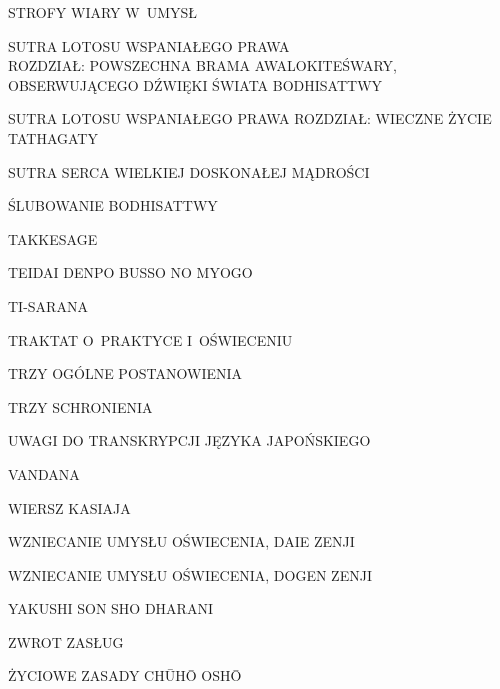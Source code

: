 \par\noindent STROFY WIARY W~UMYSŁ \dotfill \makebox[1.0cm][r]{\pageref{strofy_wiary_w_umysl}}
\par\noindent SUTRA LOTOSU WSPANIAŁEGO PRAWA\\ROZDZIAŁ: POWSZECHNA BRAMA AWALOKITEŚWARY, OBSERWUJĄCEGO DŹWIĘKI ŚWIATA BODHISATTWY \dotfill \makebox[1.0cm][r]{\pageref{sutralotosu_powszechna_brama}}
\par\noindent SUTRA LOTOSU WSPANIAŁEGO PRAWA ROZDZIAŁ: WIECZNE ŻYCIE TATHAGATY \dotfill \makebox[1.0cm][r]{\pageref{sutralotosu_wieczne_zycie}}
\par\noindent SUTRA SERCA WIELKIEJ DOSKONAŁEJ MĄDROŚCI \dotfill \makebox[1.0cm][r]{\pageref{serce_doskonalej_madrosci}}
\par\noindent ŚLUBOWANIE BODHISATTWY \dotfill \makebox[1.0cm][r]{\pageref{slubowanie_bodhisattwy}}
\par\noindent TAKKESAGE \dotfill \makebox[1.0cm][r]{\pageref{tekkesage}}
\par\noindent TEIDAI DENPO BUSSO NO MYOGO \dotfill \makebox[1.0cm][r]{\pageref{teidai_denpo_busso_no_myogo}}
\par\noindent TI-SARANA \dotfill \makebox[1.0cm][r]{\pageref{ti-sarana}}
\par\noindent TRAKTAT O~PRAKTYCE I~OŚWIECENIU \dotfill \makebox[1.0cm][r]{\pageref{traktat_o_praktyce}}
\par\noindent TRZY OGÓLNE POSTANOWIENIA \dotfill \makebox[1.0cm][r]{\pageref{trzy_ogolne_postanowienia}}
\par\noindent TRZY SCHRONIENIA \dotfill \makebox[1.0cm][r]{\pageref{trzy_schronienia}}
\par\noindent UWAGI DO TRANSKRYPCJI JĘZYKA JAPOŃSKIEGO \dotfill \makebox[1.0cm][r]{\pageref{uwagi_do_transkrypcji}}
\par\noindent VANDANA \dotfill \makebox[1.0cm][r]{\pageref{vandana}}
\par\noindent WIERSZ KASIAJA \dotfill \makebox[1.0cm][r]{\pageref{wiersz_kesy}}
\par\noindent WZNIECANIE UMYSŁU OŚWIECENIA, DAIE ZENJI \dotfill \makebox[1.0cm][r]{\pageref{wzniecanie_umyslu_oswiecenia_daie}}
\par\noindent WZNIECANIE UMYSŁU OŚWIECENIA, DOGEN ZENJI \dotfill \makebox[1.0cm][r]{\pageref{wzniecanie_umyslu_oswiecenia_dogen}}
\par\noindent YAKUSHI SON SHO DHARANI \dotfill \makebox[1.0cm][r]{\pageref{yakushi_son_sho_dharani}}
\par\noindent ZWROT ZASŁUG \dotfill \makebox[1.0cm][r]{\pageref{zwrot_zaslug}}
\par\noindent ŻYCIOWE ZASADY CH\=UH\=O OSH\=O \dotfill \makebox[1.0cm][r]{\pageref{zyciowe_zasady_chuho_osho}}
